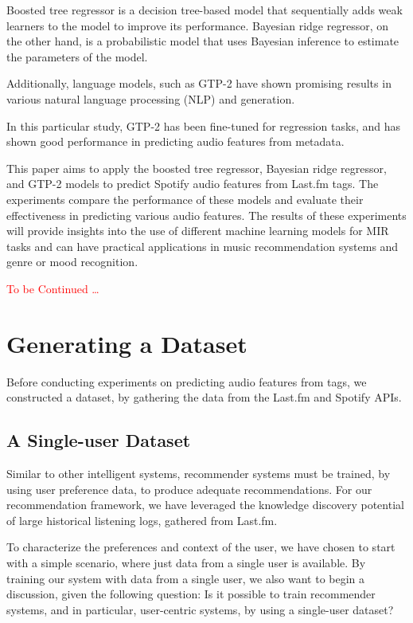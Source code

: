 \documentclass[sn-mathphys]{sn-jnl}%
\theoremstyle{thmstyleone}%
\theoremstyle{thmstyletwo}%
\theoremstyle{thmstylethree}%
\begin{document}
Boosted tree regressor is a decision tree-based model that sequentially
adds weak learners to the model to improve its performance.
Bayesian ridge regressor, on the other hand,
is a probabilistic model that uses Bayesian inference to estimate
the parameters of the model.

Additionally, language models, such as GTP-2 have shown promising results in various
natural language processing (NLP) and generation.

In this particular study, GTP-2 has been fine-tuned for regression tasks,
and has shown good performance in predicting audio features from metadata.

This paper aims to apply the boosted tree regressor,
 Bayesian ridge regressor, and GTP-2 models to predict Spotify audio features from Last.fm tags.
The experiments compare the performance of these models and evaluate their effectiveness
in predicting various audio features.
The results of these experiments will provide insights into
the use of different machine learning models for MIR tasks
and can have practical applications
in music recommendation systems and genre or mood recognition.





\textcolor{red}{To be Continued \dots }




\section{Generating a Dataset}

Before conducting experiments on predicting audio features from tags, we constructed a dataset, by gathering the data from the Last.fm and Spotify APIs.

\subsection{A Single-user Dataset}

Similar to other intelligent systems, recommender systems
must be trained, by using user preference data, to produce
adequate recommendations. For our recommendation framework,
we have leveraged the knowledge discovery potential
of large historical listening logs, gathered from Last.fm.

To characterize the preferences and context of the user, we
have chosen to start with a simple scenario, where just data
from a single user is available. By training our system with
data from a single user, we also want to begin a discussion,
given the following question: Is it possible to train
recommender systems, and in particular, user-centric systems, by
using a single-user dataset?
\end{document}
